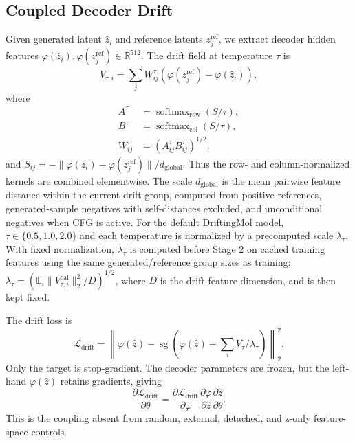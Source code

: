 \documentclass[letterpaper]{article}
\begin{document}
\subsection{Coupled Decoder Drift}

Given generated latent $\hat{z}_i$ and reference latents $z_j^{\mathrm{ref}}$,
we extract decoder hidden features
$\varphi(\hat{z}_i),\varphi(z_j^{\mathrm{ref}}) \in \mathbb{R}^{512}$. The
drift field at temperature $\tau$ is
\begin{equation}
    V_{\tau,i} =
    \sum_j W^\tau_{ij}
    \left(\varphi(z_j^{\mathrm{ref}})-\varphi(\hat{z}_i)\right),
\end{equation}
where
\begin{equation}
    \begin{aligned}
    A^\tau &= \operatorname{softmax}_{\mathrm{row}}(S/\tau),\\
    B^\tau &= \operatorname{softmax}_{\mathrm{col}}(S/\tau),\\
    W^\tau_{ij} &= (A^\tau_{ij}B^\tau_{ij})^{1/2}.
    \end{aligned}
\end{equation}
and $S_{ij}=-\|\varphi(\hat{z}_i)-\varphi(z_j^{\mathrm{ref}})\|/d_{\mathrm{global}}$.
Thus the row- and column-normalized kernels are combined elementwise. The scale
$d_{\mathrm{global}}$ is the mean pairwise feature distance within the current
drift group, computed from positive references, generated-sample negatives
with self-distances excluded, and unconditional negatives when CFG is active.
For the default DriftingMol model, $\tau \in \{0.5,1.0,2.0\}$ and each
temperature is normalized by a precomputed scale $\lambda_\tau$. With fixed
normalization, $\lambda_\tau$ is computed before Stage 2 on cached training
features using the same generated/reference group sizes as training:
$\lambda_\tau=(\mathbb{E}_i\|V_{\tau,i}^{\mathrm{cal}}\|_2^2/D)^{1/2}$, where
$D$ is the drift-feature dimension, and is then kept fixed.

The drift loss is
\begin{equation}
    \mathcal{L}_{\mathrm{drift}} =
    \left\|\varphi(\hat{z}) -
    \operatorname{sg}\left(\varphi(\hat{z})+\sum_\tau V_\tau/\lambda_\tau\right)
    \right\|_2^2.
\end{equation}
Only the target is stop-gradient. The decoder parameters are frozen, but the
left-hand $\varphi(\hat{z})$ retains gradients, giving
\begin{equation}
    \frac{\partial \mathcal{L}_{\mathrm{drift}}}{\partial \theta}
    =
    \frac{\partial \mathcal{L}_{\mathrm{drift}}}{\partial \varphi}
    \frac{\partial \varphi}{\partial \hat{z}}
    \frac{\partial \hat{z}}{\partial \theta}.
\end{equation}
This is the coupling absent from random, external, detached, and z-only
feature-space controls.
\end{document}

